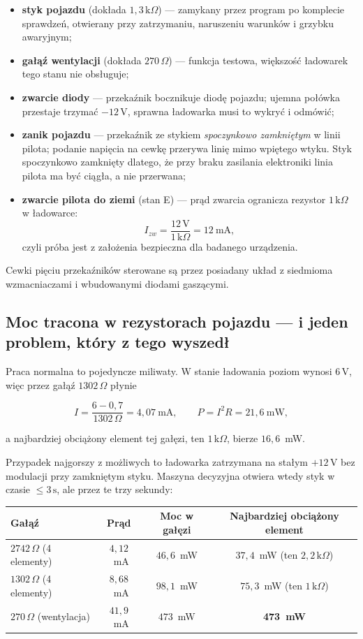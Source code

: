\documentclass[a4paper,11pt]{article}
\newcommand{\ohm}{\,\Omega}
\newcommand{\kohm}{\,\mathrm{k}\Omega}
\newcommand{\volt}{\,\mathrm{V}}
\newcommand{\sek}{\,\mathrm{s}}
\begin{document}
\begin{itemize}
\item \textbf{styk pojazdu} (dokłada $1{,}3\kohm$) --- zamykany przez program po
      komplecie sprawdzeń, otwierany przy zatrzymaniu, naruszeniu warunków
      i grzybku awaryjnym;
\item \textbf{gałąź wentylacji} (dokłada $270\ohm$) --- funkcja testowa, większość
      ładowarek tego stanu nie obsługuje;
\item \textbf{zwarcie diody} --- przekaźnik bocznikuje diodę pojazdu; ujemna połówka
      przestaje trzymać $-12\volt$, sprawna ładowarka musi to wykryć i odmówić;
\item \textbf{zanik pojazdu} --- przekaźnik ze stykiem \emph{spoczynkowo zamkniętym}
      w linii pilota; podanie napięcia na cewkę przerywa linię mimo wpiętego wtyku.
      Styk spoczynkowo zamknięty dlatego, że przy braku zasilania elektroniki linia
      pilota ma być ciągła, a nie przerwana;
\item \textbf{zwarcie pilota do ziemi} (stan E) --- prąd zwarcia ogranicza rezystor
      $1\kohm$ w ładowarce:
      \[
      I_{zw}=\frac{12\volt}{1\kohm}=12\ \mathrm{mA},
      \]
      czyli próba jest z założenia bezpieczna dla badanego urządzenia.
\end{itemize}

Cewki pięciu przekaźników sterowane są przez posiadany układ z siedmioma
wzmacniaczami i wbudowanymi diodami gaszącymi.

\subsection{Moc tracona w rezystorach pojazdu --- i jeden problem, który z tego wyszedł}

Praca normalna to pojedyncze miliwaty. W stanie ładowania poziom wynosi $6\volt$,
więc przez gałąź $1302\ohm$ płynie

\[
I=\frac{6-0{,}7}{1302\ohm}=4{,}07\ \mathrm{mA},
\qquad
P=I^2R=21{,}6\ \mathrm{mW},
\]

a najbardziej obciążony element tej gałęzi, ten $1\kohm$, bierze $16{,}6$~mW.

Przypadek najgorszy z możliwych to ładowarka zatrzymana na stałym $+12\volt$ bez
modulacji przy zamkniętym styku. Maszyna decyzyjna otwiera wtedy styk w czasie
$\le3\sek$, ale przez te trzy sekundy:

\begin{center}
\begin{tabular}{lccc}
\toprule
Gałąź & Prąd & Moc w gałęzi & Najbardziej obciążony element \\
\midrule
$2742\ohm$ (4 elementy) & $4{,}12$~mA & $46{,}6$~mW & $37{,}4$~mW (ten $2{,}2\kohm$) \\
$1302\ohm$ (4 elementy) & $8{,}68$~mA & $98{,}1$~mW & $75{,}3$~mW (ten $1\kohm$) \\
$270\ohm$ (wentylacja)  & $41{,}9$~mA & $473$~mW    & \textbf{473~mW} \\
\bottomrule
\end{tabular}
\end{center}
\end{document}
